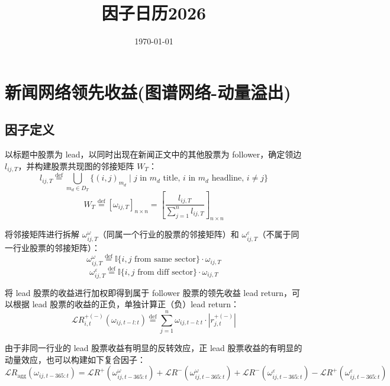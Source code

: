 \documentclass{article}
\title{因子日历2026}
\date{\today}
\begin{document}
\maketitle

\section{新闻网络领先收益(图谱网络-动量溢出)}

\subsection{因子定义}
以标题中股票为 lead，以同时出现在新闻正文中的其他股票为 follower，确定领边 \( l_{ij,T} \)，并构建股票共现图的邻接矩阵 \( W_T \)：
\begin{equation}
    l_{ij,T} \stackrel{\mathrm{def}}{=} \bigcup_{m_d \in D_T} \{(i,j)_{m_d} \mid j \text{ in } m_d \text{ title, } i \text{ in } m_d \text{ headline, } i \neq j\}
\end{equation}
\begin{equation}
    W_T \stackrel{\mathrm{def}}{=} [\omega_{ij,T}]_{n \times n} = \left[ \frac{l_{ij,T}}{\sum_{j=1}^n l_{ij,T}} \right]_{n \times n}
\end{equation}

将邻接矩阵进行拆解 \( \omega_{ij,T}^{\omega} \)（同属一个行业的股票的邻接矩阵）和 \( \omega_{ij,T}^{\varepsilon} \)（不属于同一行业股票的邻接矩阵）：
\begin{equation}
    \omega_{ij,T}^{\omega} \stackrel{\mathrm{def}}{=} \mathbb{I}\{i,j \text{ from same sector}\} \cdot \omega_{ij,T}
\end{equation}
\begin{equation}
    \omega_{ij,T}^{\varepsilon} \stackrel{\mathrm{def}}{=} \mathbb{I}\{i,j \text{ from diff sector}\} \cdot \omega_{ij,T}
\end{equation}

将 lead 股票的收益进行加权即得到属于 follower 股票的领先收益 lead return，可以根据 lead 股票的收益的正负，单独计算正（负）lead return：
\begin{equation}
    \mathcal{L}R_{i,t}^{+(-)} (\omega_{ij,t-l:t}) \stackrel{\mathrm{def}}{=} \sum_{j=1}^n \omega_{ij,t-l:t} \cdot |r_{j,t}^{+(-)}|
\end{equation}

由于非同一行业的 lead 股票收益有明显的反转效应，正 lead 股票收益的有明显的动量效应，也可以构建如下复合因子：
\begin{equation}
    \mathcal{L}R_{\mathrm{agg}} (\omega_{ij,t-365:t}) = \mathcal{L}R^{+} (\omega_{ij,t-365:t}^{\omega}) + \mathcal{L}R^{-} (\omega_{ij,t-365:t}^{\omega}) + \mathcal{L}R^{-} (\omega_{ij,t-365:t}^{\varepsilon}) - \mathcal{L}R^{+} (\omega_{ij,t-365:t}^{\varepsilon})
\end{equation}
\end{document}
